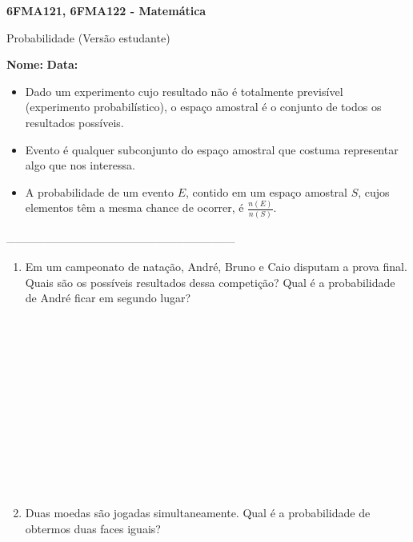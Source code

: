 \documentclass[a4paper,14pt]{article}
\begin{document}
	
	\noindent\textbf{6FMA121, 6FMA122 - Matemática} 
	
	\begin{center}Probabilidade (Versão estudante)
	\end{center}
	
	\noindent\textbf{Nome:} \underline{\hspace{10cm}}
	\noindent\textbf{Data:} \underline{\hspace{4cm}}
	
	
	\begin{multicols}{2}
	    \noindent \begin{itemize}
	    	\item Dado um experimento cujo resultado não é totalmente previsível (experimento probabilístico), o espaço amostral é o conjunto de todos os resultados possíveis.
	    	\item Evento é qualquer subconjunto do espaço amostral que costuma representar algo que nos interessa.
	    	\item A probabilidade de um evento $E$, contido em um espaço amostral $S$, cujos elementos têm a mesma chance de ocorrer, é $\frac{n(E)}{n(S)}$.
	    \end{itemize}
		\noindent\textsubscript{--------------------------------------------------------------------------}
		\begin{enumerate} 
			\item Em um campeonato de natação, André, Bruno e Caio disputam a prova final. Quais são os possíveis resultados dessa competição? Qual é a probabilidade de André ficar em segundo lugar? \\\\\\\\\\\\\\\\\\\\\\\\\\
			\item Duas moedas são jogadas simultaneamente. Qual é a probabilidade de obtermos duas faces iguais? \\\\\\\\\\\\\\\\\\\\

\end{enumerate}
\end{multicols}
\end{document}

